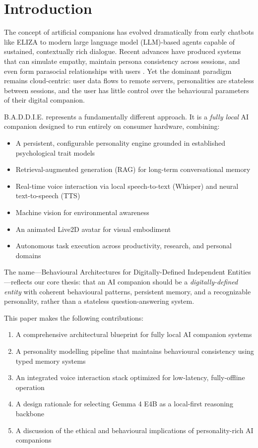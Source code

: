 \documentclass[sigconf]{acmart}
\begin{document}
\section{Introduction}

The concept of artificial companions has evolved dramatically from early chatbots like ELIZA \cite{weizenbaum1966eliza} to modern large language model (LLM)-based agents capable of sustained, contextually rich dialogue. Recent advances have produced systems that can simulate empathy, maintain persona consistency across sessions, and even form parasocial relationships with users \cite{chen2024tmlr-persona, tissaoui2026prompt}. Yet the dominant paradigm remains cloud-centric: user data flows to remote servers, personalities are stateless between sessions, and the user has little control over the behavioural parameters of their digital companion.

B.A.D.D.I.E. represents a fundamentally different approach. It is a \textit{fully local} AI companion designed to run entirely on consumer hardware, combining:

\begin{itemize}
    \item A persistent, configurable personality engine grounded in established psychological trait models
    \item Retrieval-augmented generation (RAG) for long-term conversational memory
    \item Real-time voice interaction via local speech-to-text (Whisper) and neural text-to-speech (TTS)
    \item Machine vision for environmental awareness
    \item An animated Live2D avatar for visual embodiment
    \item Autonomous task execution across productivity, research, and personal domains
\end{itemize}

The name---Behavioural Architectures for Digitally-Defined Independent Entities---reflects our core thesis: that an AI companion should be a \textit{digitally-defined entity} with coherent behavioural patterns, persistent memory, and a recognizable personality, rather than a stateless question-answering system.

This paper makes the following contributions:
\begin{enumerate}
    \item A comprehensive architectural blueprint for fully local AI companion systems
    \item A personality modelling pipeline that maintains behavioural consistency using typed memory systems
    \item An integrated voice interaction stack optimized for low-latency, fully-offline operation
    \item A design rationale for selecting Gemma 4 E4B as a local-first reasoning backbone
    \item A discussion of the ethical and behavioural implications of personality-rich AI companions
\end{enumerate}
\end{document}
